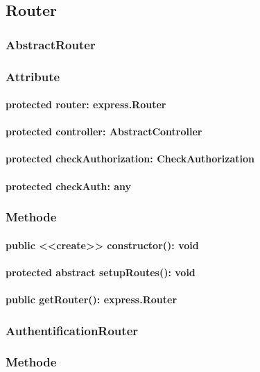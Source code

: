 \documentclass[parskip=full]{scrartcl}
\begin{document}
\subsection{Router}
\subsubsection{AbstractRouter}
\subsubsection*{Attribute}
\paragraph{protected router: express.Router}
\paragraph{protected controller: AbstractController}
\paragraph{protected checkAuthorization: CheckAuthorization}
\paragraph{protected checkAuth: any}

\subsubsection*{Methode}
\paragraph{public <<create>> constructor(): void}
\paragraph{protected abstract setupRoutes(): void}
\paragraph{public getRouter(): express.Router}

\subsubsection{AuthentificationRouter}
\subsubsection*{Methode}
\end{document}
